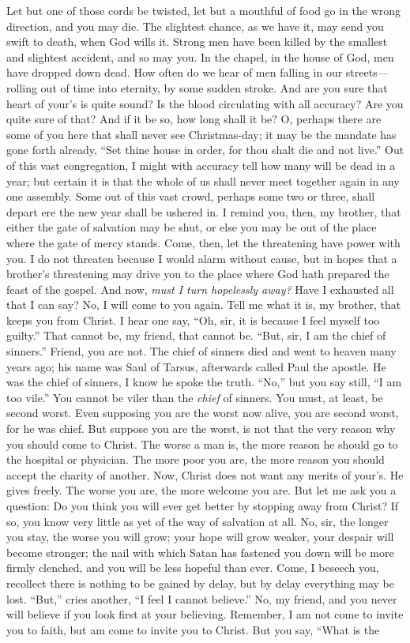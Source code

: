 \documentclass[
]{book}
\begin{document}
Let but one of those cords be twisted, let but a mouthful of food go in the wrong direction, and you may die. The slightest chance, as we have it, may send you swift to death, when God wills it. Strong men have been killed by the smallest and slightest accident, and so may you. In the chapel, in the house of God, men have dropped down dead. How often do we hear of men falling in our streets---rolling out of time into eternity, by some sudden stroke. And are you sure that heart of your's is quite sound? Is the blood circulating with all accuracy? Are you quite sure of that? And if it be so, how long shall it be? O, perhaps there are some of you here that shall never see Christmas-day; it may be the mandate has gone forth already, ``Set thine house in order, for thou shalt die and not live.'' Out of this vast congregation, I might with accuracy tell how many will be dead in a year; but certain it is that the whole of us shall never meet together again in any one assembly. Some out of this vast crowd, perhaps some two or three, shall depart ere the new year shall be ushered in. I remind you, then, my brother, that either the gate of salvation may be shut, or else you may be out of the place where the gate of mercy stands. Come, then, let the threatening have power with you. I do not threaten because I would alarm without cause, but in hopes that a brother's threatening may drive you to the place where God hath prepared the feast of the gospel. And now, \emph{must I turn hopelessly away?} Have I exhausted all that I can say? No, I will come to you again. Tell me what it is, my brother, that keeps you from Christ. I hear one say, ``Oh, sir, it is because I feel myself too guilty.'' That cannot be, my friend, that cannot be. ``But, sir, I am the chief of sinners.'' Friend, you are not. The chief of sinners died and went to heaven many years ago; his name was Saul of Tarsus, afterwards called Paul the apostle. He was the chief of sinners, I know he spoke the truth. ``No,'' but you say still, ``I am too vile.'' You cannot be viler than the \emph{chief} of sinners. You must, at least, be second worst. Even supposing you are the worst now alive, you are second worst, for he was chief. But suppose you are the worst, is not that the very reason why you should come to Christ. The worse a man is, the more reason he should go to the hospital or physician. The more poor you are, the more reason you should accept the charity of another. Now, Christ does not want any merits of your's. He gives freely. The worse you are, the more welcome you are. But let me ask you a question: Do you think you will ever get better by stopping away from Christ? If so, you know very little as yet of the way of salvation at all. No, sir, the longer you stay, the worse you will grow; your hope will grow weaker, your despair will become stronger; the nail with which Satan has fastened you down will be more firmly clenched, and you will be less hopeful than ever. Come, I beseech you, recollect there is nothing to be gained by delay, but by delay everything may be lost. ``But,'' cries another, ``I feel I cannot believe.'' No, my friend, and you never will believe if you look first at your believing. Remember, I am not come to invite you to faith, but am come to invite you to Christ. But you say, ``What is the 
\end{document}
